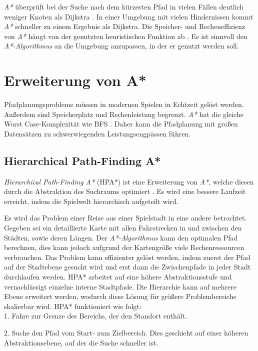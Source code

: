\textit{A*} überprüft bei der Suche nach dem kürzesten Pfad in vielen Fällen deutlich weniger Knoten als Dijkstra \cite[S.20f]{Kri09}. In einer Umgebung mit vielen Hindernissen kommt \textit{A*} schneller zu einem Ergebnis als Dijkstra. Die Speicher- und Recheneffizienz von \textit{A*} hängt von der genutzten heuristischen Funktion ab \cite[S.237]{Noo15}. Es ist sinnvoll den \textit{A*-Algorithmus} an die Umgebung anzupassen, in der er genutzt werden soll.

\section{Erweiterung von A*}
Pfadplanungsprobleme müssen in modernen Spielen in Echtzeit gelöst werden. Außerdem sind Speicherplatz und Rechenleistung begrenzt. \textit{A*} hat die gleiche Worst Case-Komplexität wie BFS \cite[S.44]{You19}. Daher kann die Pfadplanung mit großen Datensätzen zu schwerwiegenden Leistungsengpässen führen.


\subsection{Hierarchical Path-Finding A*}
\label{sec:hpa}
\textit{Hierarchical Path-Finding A*} (HPA*) ist eine Erweiterung von \textit{A*}, welche diesen durch die Abstraktion des Suchraums optimiert \cite{Bot04}. Es wird eine bessere Laufzeit erreicht, indem die Spielwelt hierarchisch aufgeteilt wird.

Es wird das Problem einer Reise aus einer Spielstadt in eine andere betrachtet. Gegeben sei ein detaillierte Karte mit allen Fahrstrecken in und zwischen den Städten, sowie deren Längen. Der \textit{A*-Algorithmus} kann den optimalen Pfad berechnen, dies kann jedoch aufgrund der Kartengröße viele Rechenressourcen verbrauchen. Das Problem kann effizienter gelöst werden, indem zuerst der Pfad auf der Stadtebene gesucht wird und erst dann die Zwischenpfade in jeder Stadt durchlaufen werden. HPA* arbeitet auf eine höhere Abstraktionsstufe und vernachlässigt einzelne interne Stadtpfade. Die Hierarchie kann auf mehrere Ebene erweitert werden, wodurch diese Lösung für größere Problembereiche skalierbar wird. HPA* funktioniert wie folgt:\\

1. Fahre zur Grenze des Bereichs, der den Standort enthält.

2. Suche den Pfad vom Start- zum Zielbereich. Dies geschieht auf einer höheren Abstraktionsebene, auf der die Suche schneller ist.

